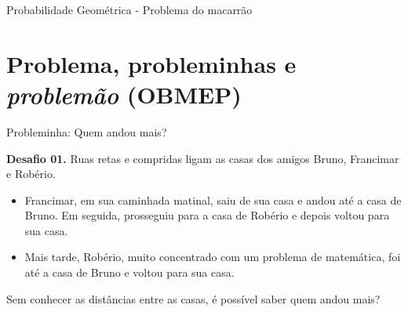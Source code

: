 \documentclass[12pt]{beamer}
\begin{document}
    \begin{frame}{Probabilidade Geométrica - Problema do macarrão}
    \begin{minipage}{\textwidth}
        \centering
    \end{minipage}
\end{frame}

\section{Problema, probleminhas e \textit{problemão} (OBMEP)}

\begin{frame}{Probleminha: Quem andou mais?}

    \begin{exampleblock}{\textbf{Desafio 01.}}
        Ruas retas e compridas ligam as casas dos amigos Bruno, Francimar e Robério.

    \begin{itemize}\justifying
        \item Francimar, em sua caminhada matinal, saiu de sua casa e andou até a casa de Bruno. Em seguida, prosseguiu para a casa de Robério e depois voltou para sua casa.
        \item Mais tarde, Robério, muito concentrado com um problema de matemática, foi até a casa de Bruno e voltou para sua casa.
    \end{itemize} Sem conhecer as distâncias entre as casas, é possível saber quem andou mais?
    
    \end{exampleblock}

\end{frame}
\end{document}
